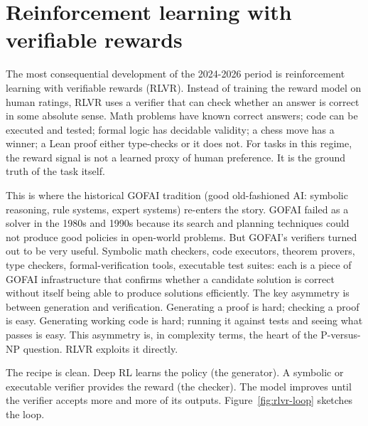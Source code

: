 \section*{Reinforcement learning with verifiable rewards}

The most consequential development of the 2024-2026 period is reinforcement learning with verifiable rewards (RLVR). Instead of training the reward model on human ratings, RLVR uses a verifier that can check whether an answer is correct in some absolute sense. Math problems have known correct answers; code can be executed and tested; formal logic has decidable validity; a chess move has a winner; a Lean proof either type-checks or it does not. For tasks in this regime, the reward signal is not a learned proxy of human preference. It is the ground truth of the task itself.

This is where the historical GOFAI tradition (good old-fashioned AI: symbolic reasoning, rule systems, expert systems) re-enters the story. GOFAI failed as a solver in the 1980s and 1990s because its search and planning techniques could not produce good policies in open-world problems. But GOFAI's verifiers turned out to be very useful. Symbolic math checkers, code executors, theorem provers, type checkers, formal-verification tools, executable test suites: each is a piece of GOFAI infrastructure that confirms whether a candidate solution is correct without itself being able to produce solutions efficiently. The key asymmetry is between generation and verification. Generating a proof is hard; checking a proof is easy. Generating working code is hard; running it against tests and seeing what passes is easy. This asymmetry is, in complexity terms, the heart of the P-versus-NP question. RLVR exploits it directly.

The recipe is clean. Deep RL learns the policy (the generator). A symbolic or executable verifier provides the reward (the checker). The model improves until the verifier accepts more and more of its outputs. Figure~\ref{fig:rlvr-loop} sketches the loop.

